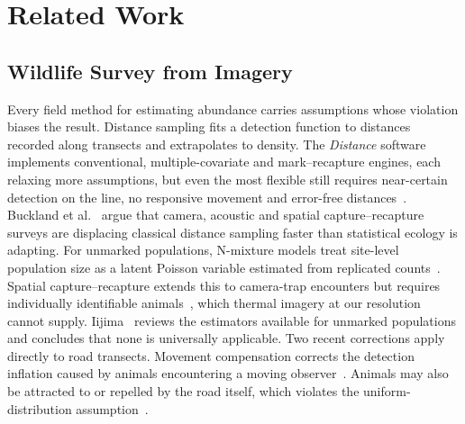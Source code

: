\section{Related Work}
\label{sec:related}

\subsection{Wildlife Survey from Imagery}
\label{sec:rw:survey}

Every field method for estimating abundance carries assumptions whose violation biases the
result. Distance sampling fits a detection function to distances recorded along transects
and extrapolates to density. The \emph{Distance} software implements conventional,
multiple-covariate and mark--recapture engines, each relaxing more assumptions, but even the
most flexible still requires near-certain detection on the line, no responsive movement and
error-free distances~\cite{thomas2010distance}. Buckland et al.~\cite{buckland2023wildlife}
argue that camera, acoustic and spatial capture--recapture surveys are displacing classical
distance sampling faster than statistical ecology is adapting. For unmarked populations,
N-mixture models treat site-level population size as a latent Poisson variable estimated
from replicated counts~\cite{royle2004nmixture}. Spatial capture--recapture extends this to
camera-trap encounters but requires individually identifiable
animals~\cite{royle2009bayesian}, which thermal imagery at our resolution cannot supply.
Iijima~\cite{iijima2020review} reviews the estimators available for unmarked populations
and concludes that none is universally applicable. Two recent corrections apply directly
to road transects. Movement compensation corrects the detection inflation caused by animals
encountering a moving observer~\cite{morgan2024wildlife}. Animals may also be attracted to
or repelled by the road itself, which violates the uniform-distribution
assumption~\cite{diefenbach2025accounting}.

